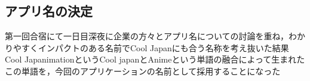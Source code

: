 \subsection{アプリ名の決定}
\par
第一回合宿にて一日目深夜に企業の方々とアプリ名についての討論を重ね，わかりやすくインパクトのある名前でCool Japanにも合う名称を考え抜いた結果Cool JapanimationというCool japanとAnimeという単語の融合によって生まれたこの単語を，今回のアプリケーションの名前として採用することになった
